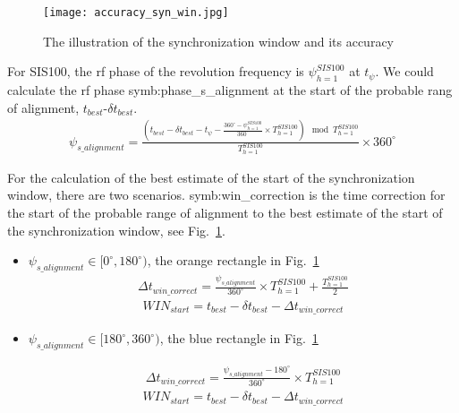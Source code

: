 \begin{figure}[!htb]
   \centering   
   \texttt{[image: accuracy\_syn\_win.jpg]}
   \caption{The illustration of the synchronization window and its accuracy}
   \label{accuracy_syn_win}
\end{figure}

For SIS100, the rf phase of the revolution frequency is $\psi_{h=1}^{SIS100}$ at $t_{\psi}$. We could calculate the rf phase \gls{symb:phase_s_alignment} at the start of the probable rang of alignment, $t_{best}$-$\delta t_{best}$.
\begin{equation}
\begin{aligned}
\psi_{s\_alignment}=\frac{(t_{best}-\delta t_{best}-t_{\psi}- \frac{360^\circ-\psi_{h=1}^{SIS100}}{360^\circ} \times {T_{h=1}^{SIS100}}) \mod T_{h=1}^{SIS100}}{T_{h=1}^{SIS100}}\times {360^\circ} 
\label{phase_after_syn}
\end{aligned}
\end{equation}

For the calculation of the best estimate of the start of the synchronization window, there are two scenarios. \gls{symb:win_correction} is the time correction for the start of the probable range of alignment to the best estimate of the start of the synchronization  window, see Fig.~\ref{accuracy_syn_win}.
\begin{itemize}
\item $\psi_{s\_alignment}\in [0^\circ,180^\circ)$, the orange rectangle in Fig.~\ref{accuracy_syn_win}
\begin{equation}
\begin{aligned}
\Delta t_{win \_correct}=\frac{\psi_{s\_alignment}}{360^\circ}\times T_{h=1}^{SIS100}+\frac{T_{h=1}^{SIS100}}{2}
\end{aligned}
\end{equation}
\begin{equation}
\begin{aligned}
WIN_{start}= t_{best}- \delta t_{best}-\Delta t_{win \_correct}
\end{aligned}
\end{equation}


\item $\psi_{s\_alignment}\in [180^\circ,360^\circ)$, the blue rectangle in Fig.~\ref{accuracy_syn_win}

\begin{equation}
\begin{aligned}
\Delta t_{win \_correct}=\frac{\psi_{s\_alignment}-180^\circ}{360^\circ}\times T_{h=1}^{SIS100}
\end{aligned}
\end{equation}
\begin{equation}
\begin{aligned}
WIN_{start}= t_{best}- \delta t_{best}-\Delta t_{win \_correct}
\end{aligned}
\end{equation}

\end{itemize}

